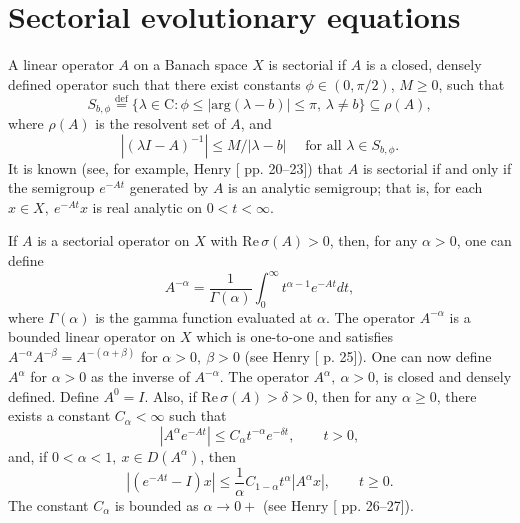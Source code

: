 \documentclass{surv-l}
\theoremstyle{plain}
\theoremstyle{definition}
\numberwithin{equation}{section}
\numberwithin{figure}{chapter}
\begin{document}
\section{Sectorial evolutionary equations}\label{sec4.2}

A linear operator $A$ on a Banach space $X$ is sectorial if $A$ is a closed, densely defined operator such that there exist constants $\phi \in(0, \pi/2)$, $M\geq 0$, such that
\begin{equation*}
S_{b,\phi}\overset{\mathrm{def}}{=}\{\lambda\in \mathrm{C}\!:\phi\leq|{\mathrm{arg}}(\lambda-b)|\leq\pi,\, \lambda\neq b\}\subseteq\rho(A),
\end{equation*}
where $\rho(A)$ is the resolvent set of $A$, and
\begin{equation*}
|(\lambda I-A)^{-1}|\leq M/|\lambda-b|\quad \text{ for all } \lambda \in S_{b,\phi}.
\end{equation*}
It is known (see, for example, Henry [\citeyear{1981henry} pp. 20--23]) that $A$ is sectorial if and only if the semigroup $e^{-At}$ generated by $A$ is an analytic semigroup; that is, for each $x\in X,\ e^{-At}x$ is real analytic on $ 0<t<\infty$.

If $A$ is a sectorial operator on $X$ with $\mathrm{Re}\,\sigma(A)>0$, then, for any $\alpha>0$, one can define
\begin{equation*}
A^{-\alpha}=\frac{1}{\Gamma(\alpha)}\int_{0}^{\infty}t^{\alpha-1}e^{-At}dt,
\end{equation*}
where $\Gamma(\alpha)$ is the gamma function evaluated at $\alpha$. The operator $A^{-\alpha}$ is a bounded linear operator on $X$ which is one-to-one and satisfies $A^{-\alpha}A^{-\beta}= A^{-(\alpha+\beta)}$ for $\alpha>0,\ \beta>0$ (see Henry [\citeyear{1981henry} p. 25]). One can now define $A^{\alpha}$ for $\alpha>0$ as the inverse of $A^{-\alpha}$. The operator $A^{\alpha},\ \alpha>0$, is closed and densely defined. Define $A^{0}=I$. Also, if $\mathrm{Re}\,\sigma(A)>\delta>0$, then for any $\alpha\geq 0$, there exists a constant $ C_{\alpha}<\infty$ such that
\begin{equation*}
|A^{\alpha}e^{-At}|\leq C_{\alpha}t^{-\alpha}e^{-\delta t},\qquad t>0,
\end{equation*}
and, if $0<\alpha<1,\ x\in D(A^{\alpha})$, then
\begin{equation*}
|(e^{-At}-I)x|\leq\frac{1}{\alpha}C_{1-\alpha}t^{\alpha}|A^{\alpha}x|,\qquad t\geq 0.
\end{equation*}
The constant $C_{\alpha}$ is bounded as $\alpha\rightarrow 0+$ (see Henry [\citeyear{1981henry} pp. 26--27]).
\end{document}
